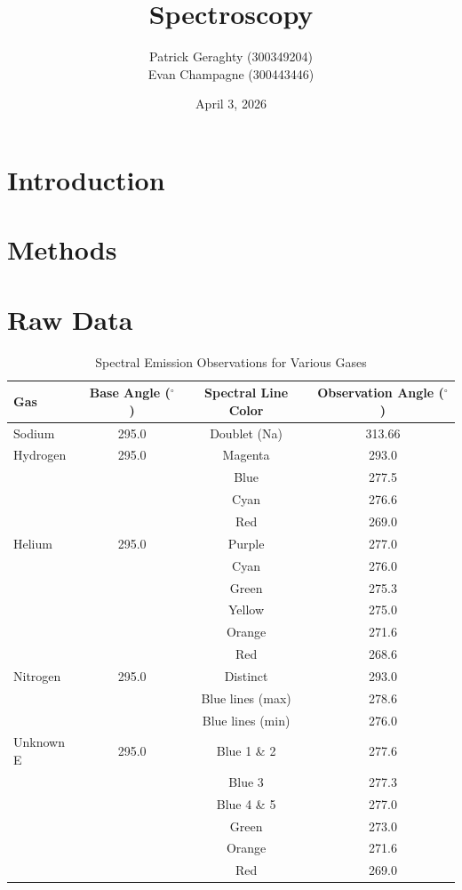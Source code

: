 \documentclass[11pt]{article}
\title{Spectroscopy}
\date{April 3, 2026}
\author{
    Patrick Geraghty (300349204) \\
    Evan Champagne (300443446)
}
\begin{document}
\maketitle

    \section{Introduction}\label{sec:introduction}

    \section{Methods}\label{sec:methods}

    \section{Raw Data}\label{sec:data}

    \begin{table}[h!]
        \centering
        \caption{Spectral Emission Observations for Various Gases}
        \label{tab:spectral_observations}
        \begin{tabular}{lccc}
        \hline
        \textbf{Gas} & \textbf{Base Angle ($^\circ$)} & \textbf{Spectral Line Color} & \textbf{Observation Angle ($^\circ$)} \\ \hline
        Sodium & 295.0 & Doublet (Na) & 313.66 \\ \hline
        Hydrogen & 295.0 & Magenta & 293.0 \\
         & & Blue & 277.5 \\
         & & Cyan & 276.6 \\
         & & Red & 269.0 \\ \hline
        Helium & 295.0 & Purple & 277.0 \\
         & & Cyan & 276.0 \\
         & & Green & 275.3 \\
         & & Yellow & 275.0 \\
         & & Orange & 271.6 \\
         & & Red & 268.6 \\ \hline
        Nitrogen & 295.0 & Distinct & 293.0 \\
         & & Blue lines (max) & 278.6 \\
         & & Blue lines (min) & 276.0 \\ \hline
        Unknown E & 295.0 & Blue 1 \& 2 & 277.6 \\
         & & Blue 3 & 277.3 \\
         & & Blue 4 \& 5 & 277.0 \\
         & & Green & 273.0 \\
         & & Orange & 271.6 \\
         & & Red & 269.0 \\ \hline
        \end{tabular}
    \end{table}
\end{document}

